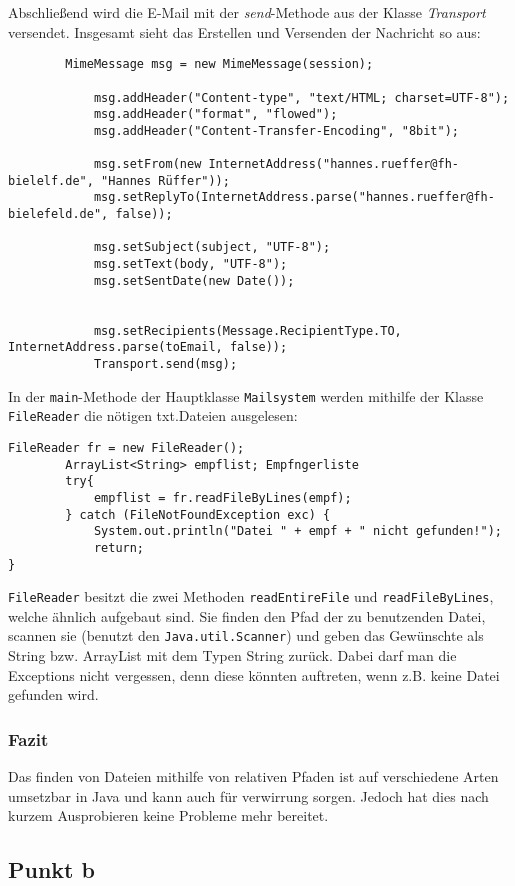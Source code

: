 		Abschließend wird die E-Mail mit der \textit{send}-Methode aus der Klasse \textit{Transport} versendet. Insgesamt sieht das Erstellen und Versenden der Nachricht so aus:
		\begin{verbatim}
		MimeMessage msg = new MimeMessage(session);
			
			msg.addHeader("Content-type", "text/HTML; charset=UTF-8");
			msg.addHeader("format", "flowed");
			msg.addHeader("Content-Transfer-Encoding", "8bit");

			msg.setFrom(new InternetAddress("hannes.rueffer@fh-bielelf.de", "Hannes Rüffer"));
			msg.setReplyTo(InternetAddress.parse("hannes.rueffer@fh-bielefeld.de", false));

			msg.setSubject(subject, "UTF-8");
			msg.setText(body, "UTF-8");
			msg.setSentDate(new Date());
			

			msg.setRecipients(Message.RecipientType.TO, InternetAddress.parse(toEmail, false));
			Transport.send(msg);  
		\end{verbatim}
		
		In der \verb|main|-Methode der Hauptklasse \verb|Mailsystem| werden mithilfe der Klasse \verb|FileReader| die nötigen txt.Dateien ausgelesen:

\begin{lstlisting}
FileReader fr = new FileReader();
        ArrayList<String> empflist; Empfngerliste
        try{
            empflist = fr.readFileByLines(empf);
        } catch (FileNotFoundException exc) {
            System.out.println("Datei " + empf + " nicht gefunden!");
            return;
}
\end{lstlisting}

\verb|FileReader| besitzt die zwei Methoden \verb|readEntireFile| und \verb|readFileByLines|, welche ähnlich aufgebaut sind. Sie finden den Pfad der zu benutzenden Datei, scannen sie (benutzt den \verb|Java.util.Scanner|) und geben das Gewünschte als String bzw. ArrayList mit dem Typen String zurück. Dabei darf man die Exceptions nicht vergessen, denn diese könnten auftreten, wenn z.B. keine Datei gefunden wird.


		\subsubsection{\textbf{Fazit}}
		Das finden von Dateien mithilfe von relativen Pfaden ist auf verschiedene Arten umsetzbar in Java und kann auch für verwirrung sorgen. Jedoch hat dies nach kurzem Ausprobieren keine Probleme mehr bereitet.
	\subsection{\large Punkt b}
